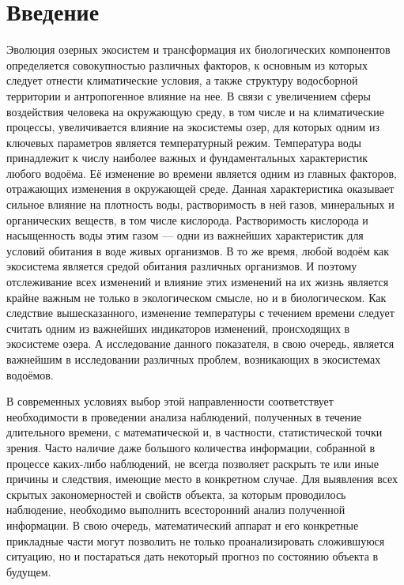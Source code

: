 
\newpage

\chapter*{Введение}

Эволюция озерных экосистем и трансформация их биологических компонентов определяется совокупностью различных факторов, к основным из которых следует отнести климатические условия, а также структуру водосборной территории и антропогенное влияние на нее. В связи с увеличением сферы воздействия человека на окружающую среду, в том числе и на климатические процессы, увеличивается влияние на экосистемы озер, для которых одним из ключевых параметров является температурный режим. Температура воды принадлежит к числу наиболее важных и фундаментальных характеристик любого водоёма. Её изменение во времени является одним из главных факторов, отражающих изменения в окружающей среде. Данная характеристика оказывает сильное влияние на плотность воды, растворимость в ней газов, минеральных и органических веществ, в том числе кислорода. Растворимость кислорода и насыщенность воды этим газом --- одни из важнейших характеристик для условий обитания в воде живых организмов. В то же время, любой водоём как экосистема является средой обитания различных организмов. И поэтому отслеживание всех изменений и влияние этих изменений на их жизнь является крайне важным не только в экологическом смысле, но и в биологическом. Как следствие вышесказанного, изменение температуры с течением времени следует считать одним из важнейших индикаторов изменений, происходящих в экосистеме озера. А исследование данного показателя, в свою очередь, является важнейшим в исследовании различных проблем, возникающих в экосистемах водоёмов. 

В современных условиях выбор этой направленности соответствует необходимости в проведении анализа наблюдений, полученных в течение длительного времени, с математической и, в частности, статистической точки зрения. Часто наличие даже большого количества информации, собранной в процессе каких-либо наблюдений, не всегда позволяет раскрыть те или иные причины и следствия, имеющие место в конкретном случае. Для выявления всех скрытых закономерностей и свойств объекта, за которым проводилось наблюдение, необходимо выполнить всесторонний анализ полученной информации. В свою очередь, математический аппарат и его конкретные прикладные части могут позволить не только проанализировать сложившуюся ситуацию, но и постараться дать некоторый прогноз по состоянию объекта в будущем.

